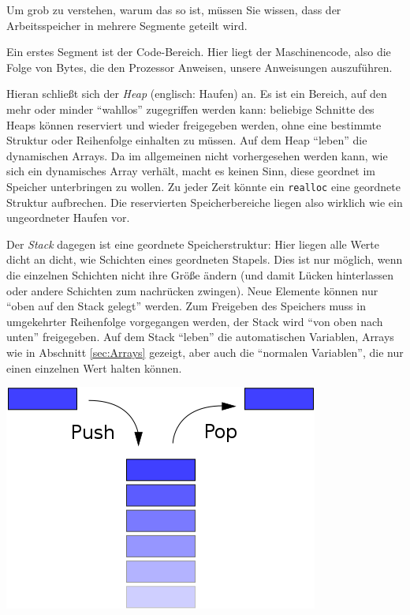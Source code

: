 Um grob zu verstehen, warum das so ist, müssen Sie wissen, dass der Arbeitsspeicher in mehrere Segmente geteilt wird. 

Ein erstes Segment ist der Code-Bereich. Hier liegt der Maschinencode, also die Folge von Bytes, die den Prozessor Anweisen, unsere Anweisungen auszuführen. 

Hieran schließt sich der \emph{Heap} (englisch: Haufen) an. Es ist ein Bereich, auf den mehr oder minder \enquote{wahllos} zugegriffen werden kann: beliebige Schnitte des Heaps können reserviert und wieder freigegeben werden, ohne eine bestimmte Struktur oder Reihenfolge einhalten zu müssen. Auf dem Heap \enquote{leben} die dynamischen Arrays. Da im allgemeinen nicht vorhergesehen werden kann, wie sich ein dynamisches Array verhält, macht es keinen Sinn, diese geordnet im Speicher unterbringen zu wollen. Zu jeder Zeit könnte ein \texttt{realloc} eine geordnete Struktur aufbrechen. Die reservierten Speicherbereiche liegen also wirklich wie ein ungeordneter Haufen vor.

Der \emph{Stack} dagegen ist eine geordnete Speicherstruktur: Hier liegen alle Werte dicht an dicht, wie Schichten eines geordneten Stapels. Dies ist nur möglich, wenn die einzelnen Schichten nicht ihre Größe ändern (und damit Lücken hinterlassen oder andere Schichten zum nachrücken zwingen). Neue Elemente können nur \enquote{oben auf den Stack gelegt} werden. Zum Freigeben des Speichers muss in umgekehrter Reihenfolge vorgegangen werden, der Stack wird \enquote{von oben nach unten} freigegeben. Auf dem Stack \enquote{leben} die automatischen Variablen, \ie Arrays wie in Abschnitt \ref{sec:Arrays} gezeigt, aber auch die \enquote{normalen Variablen}, die nur einen einzelnen Wert halten können.

\begin{tcolorbox}[title=Visualisierung: Heap und Stack]
\hspace{10pt}
\includegraphics[width=.2\linewidth]{./gfx/Stack}
\end{tcolorbox}


